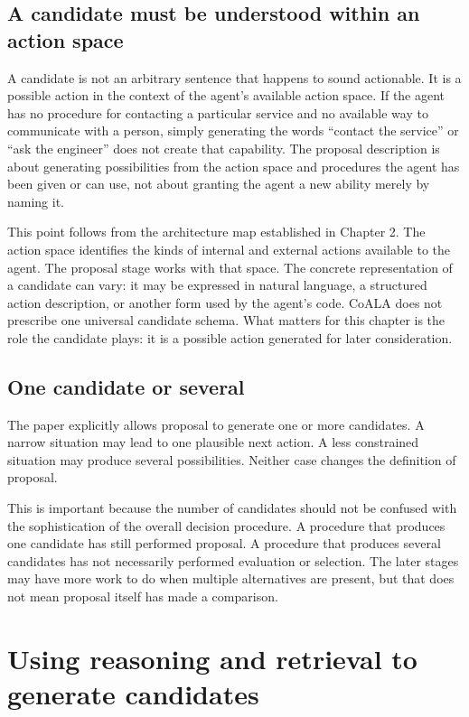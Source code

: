 \subsection{A candidate must be understood within an action space}

A candidate is not an arbitrary sentence that happens to sound actionable. It is a possible action in the context of the agent's available action space. If the agent has no procedure for contacting a particular service and no available way to communicate with a person, simply generating the words ``contact the service'' or ``ask the engineer'' does not create that capability. The proposal description is about generating possibilities from the action space and procedures the agent has been given or can use, not about granting the agent a new ability merely by naming it.

This point follows from the architecture map established in Chapter 2. The action space identifies the kinds of internal and external actions available to the agent. The proposal stage works with that space. The concrete representation of a candidate can vary: it may be expressed in natural language, a structured action description, or another form used by the agent's code. CoALA does not prescribe one universal candidate schema. What matters for this chapter is the role the candidate plays: it is a possible action generated for later consideration.

\subsection{One candidate or several}

The paper explicitly allows proposal to generate one or more candidates. A narrow situation may lead to one plausible next action. A less constrained situation may produce several possibilities. Neither case changes the definition of proposal.

This is important because the number of candidates should not be confused with the sophistication of the overall decision procedure. A procedure that produces one candidate has still performed proposal. A procedure that produces several candidates has not necessarily performed evaluation or selection. The later stages may have more work to do when multiple alternatives are present, but that does not mean proposal itself has made a comparison.

\section{Using reasoning and retrieval to generate candidates}
\label{sec:reasoning-retrieval-proposal}

